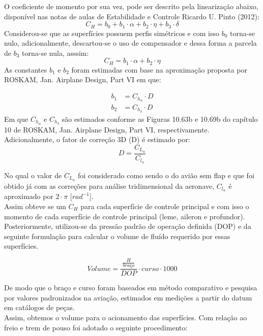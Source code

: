 O coeficiente de momento por sua vez, pode ser descrito pela linearização abaixo, disponível nas notas de aulas de Estabilidade e Controle Ricardo U. Pinto (2012):
\begin{equation}
    C_H= b_0 + b_1 \cdot \alpha +b_2 \cdot \eta + b_3 \cdot \delta
\end{equation}
Considerou-se que as superfícies possuem perfis simétricos e com isso $b_0$ torna-se nulo, adicionalmente, descartou-se o uso de compensador e dessa forma a parcela de $b_3$ torna-se nula, asssim:
\begin{equation*}
    C_H = b_1 \cdot \alpha + b_2 \cdot \eta
\end{equation*}
As constantes $b_1$ e $b_2$ foram estimadas com base na aproximação proposta por ROSKAM, Jan. Airplane Design, Part VI em que:

\begin{equation}
\begin{aligned}
    b_1 &= C_{h_\alpha} \cdot D \\[6pt]
    b_2 &= C_{h_\delta} \cdot D
\end{aligned}
\end{equation}
Em que $C_{h_\alpha}$ e $C_{h_\delta}$ são estimados conforme as Figuras 10.63b e 10.69b do capítulo 10 de ROSKAM, Jan. Airplane Design, Part VI, respectivamente. Adicionalmente, o fator de correção 3D (D) é estimado por:
\begin{equation}
    D = \frac{C_{L_\alpha}}{C_{l_\alpha}}
\end{equation}

No qual o valor de $C_{L_\alpha}$ foi considerado como sendo o do avião sem flap e que foi obtido já com as correções para análise tridimensional da aeronave, $C_{l_\alpha}$ é aproximado por $2 \cdot \pi $ [$rad^{-1}$].\\
Assim obteve se um $C_H$ para cada superfície de controle principal e com isso o momento de cada superfície de controle principal (leme, aileron e profundor). Posteriormente, utilizou-se da pressão padrão de operação definida (DOP) e da seguinte formulação para calcular o volume de fluído requerido por essas superfícies.

\begin{equation}
    Volume = \frac{\frac{H}{braço}}{DOP } \cdot curso \cdot 1000
\end{equation}

De modo que o braço e curso foram baseados em método comparativo e pesquisa por valores padronizados na aviação, estimados em medições a partir do datum em catálogos de peças. \\
Assim, obtemos o volume para o acionamento das superfícies. Com relação ao freio e trem de pouso foi adotado o seguinte procedimento:

